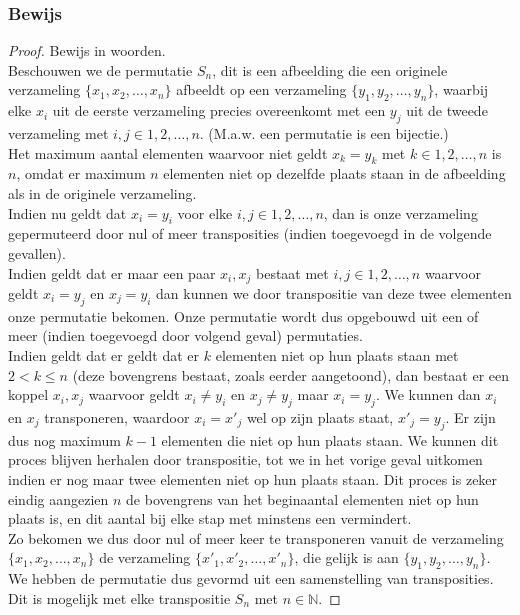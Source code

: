 \documentclass[lineaire_algebra_oplossingen.tex]{subfiles}
\begin{document}
\subsubsection*{Bewijs}
\begin{proof}
Bewijs in woorden.\\
Beschouwen we de permutatie $S_n$, dit is een afbeelding die een originele verzameling $\{x_1,x_2,\dotsc,x_n\}$ afbeeldt op een verzameling $\{y_1,y_2,\dotsc,y_n\}$, waarbij elke $x_i$ uit de eerste verzameling precies overeenkomt met een $y_j$ uit de tweede verzameling met $i,j \in {1,2,\dotsc,n}$. (M.a.w. een permutatie is een bijectie.)\\
Het maximum aantal elementen waarvoor niet geldt $x_k = y_k$ met $k \in {1,2,\dotsc,n}$ is $n$, omdat er maximum $n$ elementen niet op dezelfde plaats staan in de afbeelding als in de originele verzameling.\\
Indien nu geldt dat $x_i = y_i$ voor elke $i,j \in {1,2,\dotsc,n}$, dan is onze verzameling gepermuteerd door nul of meer transposities (indien toegevoegd in de volgende gevallen).\\
Indien geldt dat er maar een paar $x_i, x_j$ bestaat met $i,j \in {1,2,\dotsc,n}$ waarvoor geldt $x_i = y_j$ en $x_j = y_i$ dan kunnen we door transpositie van deze twee elementen onze permutatie bekomen. Onze permutatie wordt dus opgebouwd uit een of meer (indien toegevoegd door volgend geval) permutaties.\\
Indien geldt dat er geldt dat er $k$ elementen niet op hun plaats staan met $2 < k \leq n$ (deze bovengrens bestaat, zoals eerder aangetoond), dan bestaat er een koppel $x_i, x_j$ waarvoor geldt $x_i \neq y_i$ en $x_j \neq y_j$ maar $x_i = y_j$. We kunnen dan $x_i$ en $x_j$ transponeren, waardoor $x_i = x'_j$ wel op zijn plaats staat, $x'_j=y_j$. Er zijn dus nog maximum $k-1$ elementen die niet op hun plaats staan. We kunnen dit proces blijven herhalen door transpositie, tot we in het vorige geval uitkomen indien er nog maar twee elementen niet op hun plaats staan. Dit proces is zeker eindig aangezien $n$ de bovengrens van het beginaantal elementen niet op hun plaats is, en dit aantal bij elke stap met minstens een vermindert.\\
Zo bekomen we dus door nul of meer keer te transponeren vanuit de verzameling $\{x_1,x_2,\dotsc,x_n\}$ de verzameling $\{x'_1,x'_2,\dotsc,x'_n\}$, die gelijk is aan $\{y_1,y_2,\dotsc,y_n\}$. We hebben de permutatie dus gevormd uit een samenstelling van transposities. Dit is mogelijk met elke transpositie $S_n$ met $n \in \mathbb{N}$.


\end{proof}
\end{document}

